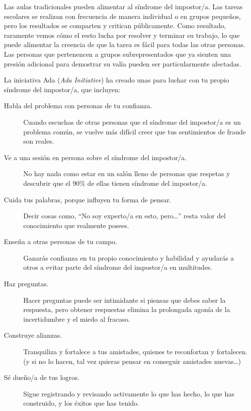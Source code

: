 Las aulas tradicionales pueden alimentar al síndrome del impostor/a.
Las tareas escolares se realizan con frecuencia de manera individual o en grupos pequeños,
pero los resultados se comparten y critican públicamente.
Como resultado,
raramente vemos cómo el resto lucha por resolver y terminar su trabajo,
lo que puede alimentar la creencia de que la tarea es fácil para todas las otras personas.
Las personas que pertenencen a grupos subrepresentados que ya sienten una presión adicional para demostrar su valía
pueden ser particularmente afectadas.

La iniciativa Ada (\emph{Ada Initiative}) ha creado unas 
para luchar con tu propio síndrome del impostor/a,
que incluyen:

\begin{description}

\item[Habla del problema con personas de tu confianza.]
  Cuando escuchas de otras personas que el síndrome del impostor/a es un problema común,
  se vuelve más difícil creer que tus sentimientos de fraude son reales.

\item[Ve a una sesión en persona sobre el síndrome del impostor/a.]
  No hay nada como estar en un salón lleno de personas que respetas
  y descubrir que el 90\% de ellas tienen síndrome del impostor/a.

\item[Cuida tus palabras, porque influyen tu forma de pensar.]
  Decir cosas como,
  ``No soy experto/a en esto, pero{\dots}''
  resta valor del conocimiento que realmente posees.

\item[Enseña a otras personas de tu campo.]
  Ganarás confianza en tu propio conocimiento y habilidad
  y ayudarás a otros a evitar parte del síndrome del impostor/a en multitudes.

\item[Haz preguntas.]
    Hacer preguntas puede ser intimidante si piensas que debes saber la respuesta,
    pero obtener respuestas elimina la prolongada agonía de la incertidumbre y el miedo al fracaso.

\item[Construye alianzas.]
  Tranquiliza y fortalece a tus amistades,
  quienes te reconfortan y fortalecen.
  (y si no lo hacen, tal vez quieras pensar en conseguir amistades nuevas{\ldots})

\item[Sé dueño/a de tus logros.]
  Sigue registrando y revisando activamente lo que has hecho,
  lo que has construido,
  y los éxitos que has tenido.

\end{description}

